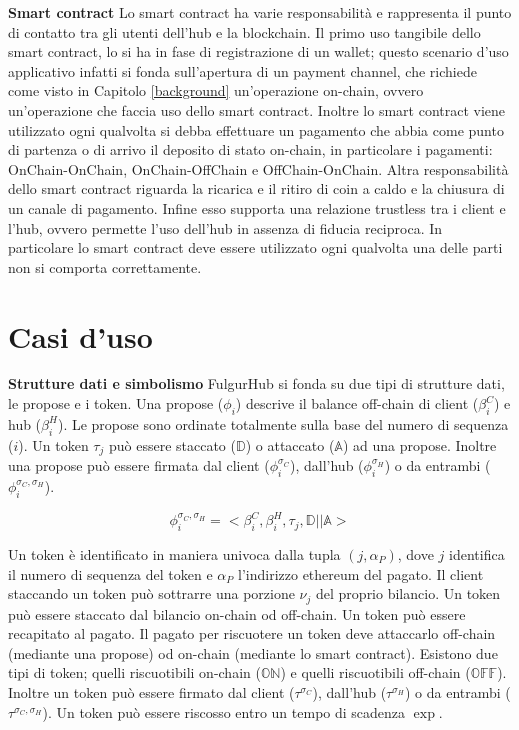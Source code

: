 \documentclass[12pt,italian,]{book}
\begin{document}
\textbf{\textbf{Smart contract}} Lo smart contract ha varie responsabilità e rappresenta il punto di contatto tra gli utenti dell'hub e la blockchain. Il primo uso tangibile dello smart contract, lo si ha in fase di registrazione di un wallet; questo scenario d'uso applicativo infatti si fonda sull'apertura di un payment channel, che richiede come visto in Capitolo \ref{background} un'operazione on-chain, ovvero un'operazione che faccia uso dello smart contract. Inoltre lo smart contract viene utilizzato ogni qualvolta si debba effettuare un pagamento che abbia come punto di partenza o di arrivo il deposito di stato on-chain, in particolare i pagamenti: OnChain-OnChain, OnChain-OffChain e OffChain-OnChain. Altra responsabilità dello smart contract riguarda la ricarica e il ritiro di coin a caldo e la chiusura di un canale di pagamento. Infine esso supporta una relazione trustless tra i client e l'hub, ovvero permette l'uso dell'hub in assenza di fiducia reciproca. In particolare lo smart contract deve essere utilizzato ogni qualvolta una delle parti non si comporta correttamente.

\hypertarget{casi-duso}{%
\section{Casi d'uso}\label{casi-duso}}

\textbf{\textbf{Strutture dati e simbolismo}} FulgurHub si fonda su due tipi di strutture dati, le propose e i token. Una propose (\(\phi_i\)) descrive il balance off-chain di client (\(\beta^C_i\)) e hub (\(\beta^H_i\)). Le propose sono ordinate totalmente sulla base del numero di sequenza (\(i\)). Un token \(\tau_j\) può essere staccato (\(\mathbb{D}\)) o attaccato (\(\mathbb{A}\)) ad una propose. Inoltre una propose può essere firmata dal client (\(\phi^{\sigma_C}_i\)), dall'hub (\(\phi^{\sigma_H}_i\)) o da entrambi (\(\phi^{\sigma_C,\sigma_H}_i\)).

\begin{equation}
\label{Un esempio di propose}
\phi^{\sigma_C, \sigma_H}_i = <\beta^C_i, \beta^H_i, \tau_j ,\mathbb{D}||\mathbb{A}>
\end{equation}

Un token è identificato in maniera univoca dalla tupla \((j, \alpha_P)\), dove \(j\) identifica il numero di sequenza del token e \(\alpha_P\) l'indirizzo ethereum del pagato. Il client staccando un token può sottrarre una porzione \(\nu_j\) del proprio bilancio. Un token può essere staccato dal bilancio on-chain od off-chain. Un token può essere recapitato al pagato. Il pagato per riscuotere un token deve attaccarlo off-chain (mediante una propose) od on-chain (mediante lo smart contract). Esistono due tipi di token; quelli riscuotibili on-chain (\(\mathbb{ON}\)) e quelli riscuotibili off-chain (\(\mathbb{OFF}\)). Inoltre un token può essere firmato dal client (\(\tau^{\sigma_C}\)), dall'hub (\(\tau^{\sigma_H}\)) o da entrambi (\(\tau^{\sigma_C,\sigma_H}\)). Un token può essere riscosso entro un tempo di scadenza \(\exp\).
\end{document}
